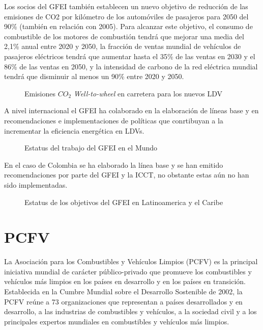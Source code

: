 Los socios del GFEI también establecen un nuevo objetivo de reducción de las emisiones de CO2 por kilómetro de los automóviles de pasajeros para 2050 del 90\% (también en relación con 2005). Para alcanzar este objetivo, el consumo de combustible de los motores de combustión tendrá que mejorar una media del 2,1\% anual entre 2020 y 2050, la fracción de ventas mundial de vehículos de pasajeros eléctricos tendrá que aumentar hasta el 35\% de las ventas en 2030 y el 86\% de las ventas en 2050, y la intensidad de carbono de la red eléctrica mundial tendrá que disminuir al menos un 90\% entre 2020 y 2050. \cite{Prospects_GFEI}

 \begin{figure}[htbp]
   \centering
   
    \caption{Emisiones $CO_2$ \textit{Well-to-wheel} en carretera para los nuevos LDV \cite{Prospects_GFEI}}
    \label{fig:prospects-GFEI}
\end{figure}

A nivel internacional el GFEI ha colaborado en la elaboración de líneas base y en recomendaciones e implementaciones de políticas que conrtibuyan a la incrementar la eficiencia energética en LDVs.

 \begin{figure}[htbp]
   \centering
   
    \caption{Estatus del trabajo del GFEI en el Mundo \cite{GlobalStatus_GFEI}}
    \label{fig:statusworld-GFEI}
\end{figure}


En el caso de Colombia se ha elaborado la línea base y se han emitido recomendaciones por parte del GFEI y la ICCT, no obstante estas aún no han sido implementadas.

 \begin{figure}[htbp]
   \centering
   
    \caption{Estatus de los objetivos del GFEI en Latinoamerica y el Caribe \cite{GlobalStatus_GFEI}}
    \label{fig:statuslatam-GFEI}
\end{figure}

\section{PCFV}

La Asociación para los Combustibles y Vehículos Limpios (PCFV) es la principal iniciativa mundial de carácter público-privado que promueve los combustibles y vehículos más limpios en los países en desarrollo y en los países en transición. Establecida en la Cumbre Mundial sobre el Desarrollo Sostenible de 2002, la PCFV reúne a 73 organizaciones que representan a países desarrollados y en desarrollo, a las industrias de combustibles y vehículos, a la sociedad civil y a los principales expertos mundiales en combustibles y vehículos más limpios. \cite{Vehicles_PCFV}

